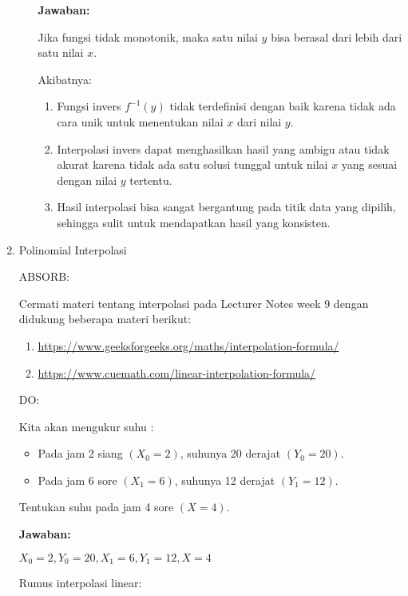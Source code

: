 \documentclass[a4paper]{article}
\begin{document}
\begin{enumerate}[itemsep=1em,leftmargin=*]
\begin{enumerate}
    \textbf{Jawaban:}

    Jika fungsi tidak monotonik, maka satu nilai  \(y\) bisa berasal dari lebih dari satu nilai \(x\).

    Akibatnya:

    \begin{enumerate}
      \item Fungsi invers \(f^{-1}(y)\) tidak terdefinisi dengan baik karena tidak ada cara unik untuk menentukan nilai \(x\) dari nilai \(y\).
      \item Interpolasi invers dapat menghasilkan hasil yang ambigu atau tidak akurat karena tidak ada satu solusi tunggal untuk nilai \(x\) yang sesuai dengan nilai \(y\) tertentu.
      \item Hasil interpolasi bisa sangat bergantung pada titik data yang dipilih, sehingga sulit untuk mendapatkan hasil yang konsisten.
    \end{enumerate}

  \end{enumerate}

  \item Polinomial Interpolasi
  
  ABSORB:

  Cermati materi tentang interpolasi pada Lecturer Notes week 9 dengan didukung beberapa materi berikut:

  \begin{enumerate}
    \item \url{https://www.geeksforgeeks.org/maths/interpolation-formula/}
    \item \url{https://www.cuemath.com/linear-interpolation-formula/}
  \end{enumerate}

  DO:

  Kita akan mengukur suhu :

  \begin{itemize}
    \item Pada jam 2 siang \((X_0 = 2)\), suhunya 20 derajat \((Y_0 = 20)\).
    \item Pada jam 6 sore \((X_1 = 6)\), suhunya 12 derajat \((Y_1 = 12)\).
  \end{itemize}

  Tentukan suhu pada jam 4 sore \((X = 4)\).

  \textbf{Jawaban:}

  \(X_0 = 2, Y_0 = 20, X_1 = 6, Y_1 = 12, X = 4\)

  Rumus interpolasi linear:


\end{enumerate}
\end{document}
